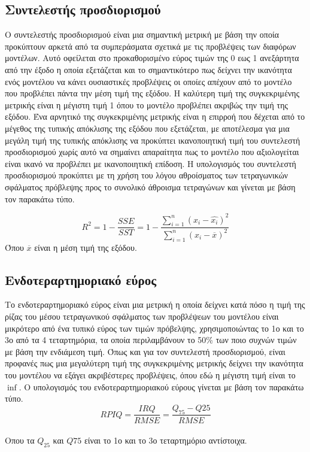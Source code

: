 \subsection{Συντελεστής προσδιορισμού}
Ο συντελεστής προσδιορισμού  είναι μια σημαντική μετρική με βάση την οποία προκύπτουν αρκετά από τα συμπεράσματα σχετικά με τις προβλέψεις των διαφόρων μοντέλων. Αυτό οφείλεται στο προκαθορισμένο εύρος τιμών της 0 εως 1 ανεξάρτητα από την έξοδο η οποία εξετάζεται και το σημαντικότερο πως δείχνει την ικανότητα ενός μοντέλου να κάνει ουσιαστικές προβλέψεις οι οποίες απέχουν από το μοντέλο που προβλέπει πάντα την μέση τιμή της εξόδου. Η καλύτερη τιμή της συγκεκριμένης μετρικής είναι η μέγιστη τιμή 1 όπου το μοντέλο προβλέπει ακριβώς την τιμή της εξόδου. Ένα αρνητικό της συγκεκριμένης μετρικής είναι η επιρροή που δέχεται από το μέγεθος της τυπικής απόκλισης της εξόδου που εξετάζεται, με αποτέλεσμα για μια μεγάλη τιμή της τυπικής απόκλισης να προκύπτει ικανοποιητική τιμή του συντελεστή προσδιορισμού χωρίς αυτό να σημαίνει απαραίτητα πως το μοντέλο που αξιολογείται είναι ικανό να προβλέπει με ικανοποιητική επίδοση. Η υπολογισμός του συντελεστή προσδιορισμού προκύπτει με τη χρήση του λόγου αθροίσματος των τετραγωνικών σφάλματος πρόβλεψης  προς το συνολικό άθροισμα τετραγώνων  και γίνεται με βάση τον παρακάτω τύπο.

$$R^2=1-\frac{SSE}{SST}=1-\frac{\sum_{i=1}^{n} {\left(x_{i}-\hat{x_{i}}\right)}^2}{\sum_{i=1}^{n} {\left(x_{i}-\overline{x}\right)}^2}$$
Όπου $\overline{x}$ είναι η μέση τιμή της εξόδου.

\subsection{Ενδοτεραρτημοριακό εύρος}
Το ενδοτεραρτημοριακό εύρος είναι μια μετρική η οποία δείχνει κατά πόσο η τιμή της ρίζας του μέσου τετραγωνικού σφάλματος των προβλέψεων του μοντέλου είναι μικρότερο από ένα τυπικό εύρος των τιμών πρόβελψης, χρησιμοποιώντας το 1ο και το 3ο από τα 4 τεταρτημόρια, τα οποία περιλαμβάνουν το 50\% των ποιο συχνών τιμών με βάση την ενδιάμεση τιμή. Όπως και για τον συντελεστή προσδιορισμού, είναι προφανές πως μια μεγαλύτερη τιμή της συγκεκριμένης μετρικής δείχνει την ικανότητα του μοντέλου να εξάγει ακριβέστερες προβλέψεις, όπου εδώ η μέγιστη τιμή είναι το $\inf$. Ο υπολογισμός του ενδοτεραρτημοριακού εύρους γίνεται με βάση τον παρακάτω τύπο.\\

$$RPIQ=\frac{IRQ}{RMSE}=\frac{Q_{75}-Q{25}}{RMSE}$$ \\
Οπου τα $Q_{25}$ και $Q{75}$ είναι το 1ο και το 3ο τεταρτημόριο αντίστοιχα.
